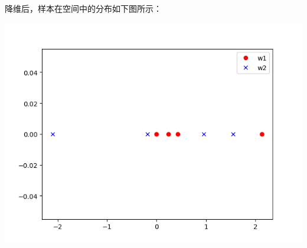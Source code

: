 \documentclass[a4paper, UTF8, 12pt]{ctexart}
\begin{document}
    降维后，样本在空间中的分布如下图所示：
    \begin{center}
        \includegraphics[scale=0.8]{asw2_2.png}
    \end{center}
\end{document}
